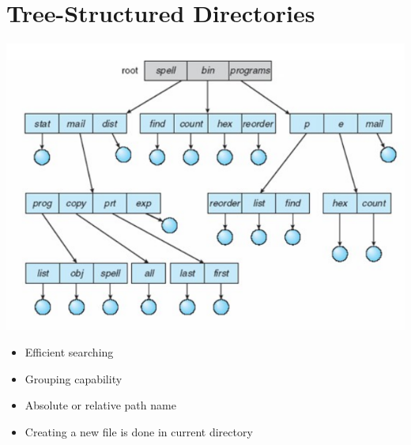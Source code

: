 \documentclass{article}[18pt]
\begin{document}
\section{Tree-Structured Directories}
\begin{center}
	\includegraphics[scale=0.7]{tree}
\end{center}
\begin{itemize}
	\item Efficient searching
	\item Grouping capability
	\item Absolute or relative path name
	\item Creating a new file is done in current directory
\end{itemize}
\end{document}
